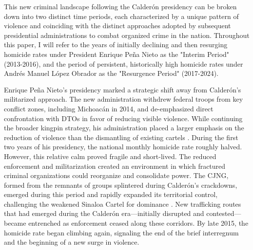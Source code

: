 \documentclass[12pt,letter,english,intoc,bibliography=totoc,index=totoc,BCOR10mm,captions=tableheading,nottitlepage,fleqn]{article}
\theoremstyle{break}
\begin{document}
This new criminal landscape following the Calder\'{o}n presidency can be broken down into two distinct time periods, each characterized by a unique pattern of violence and coinciding with the distinct approaches adopted by subsequent presidential administrations to combat organized crime in the nation. Throughout this paper, I will refer to the years of initially declining and then resurging homicide rates under President Enrique Pe\~{n}a Nieto as the "Interim Period" (2013-2016), and the period of persistent, historically high homicide rates under Andr\'{e}s Manuel L\'{o}pez Obrador as the "Resurgence Period" (2017-2024).

Enrique Pe\~{n}a Nieto's presidency marked a strategic shift away from Calder\'{o}n's militarized approach. The new administration withdrew federal troops from key conflict zones, including Michoac\'{a}n in 2014, and de-emphasized direct confrontation with DTOs in favor of reducing visible violence. While continuing the broader kingpin strategy, his administration placed a larger emphasis on the reduction of violence than the dismantling of existing cartels \citep{mccormik2019}. During the first two years of his presidency, the national monthly homicide rate roughly halved. However, this relative calm proved fragile and short-lived. The reduced enforcement and militarization created an environment in which fractured criminal organizations could reorganize and consolidate power. The CJNG, formed from the remnants of groups splintered during Calder\'{o}n's crackdowns, emerged during this period and rapidly expanded its territorial control, challenging the weakened Sinaloa Cartel for dominance \citep{rios2018}. New trafficking routes that had emerged during the Calder\'{o}n era---initially disrupted and contested---became entrenched as enforcement ceased along these corridors. By late 2015, the homicide rate began climbing again, signaling the end of the brief interregnum and the beginning of a new surge in violence.
\end{document}
